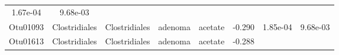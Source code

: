 \documentclass[11pt,]{article}
\begin{document}
\begin{longtable}[]{@{}cccccccc@{}}
\begin{minipage}[t]{0.08\columnwidth}
1.67e-04\strut
\end{minipage} & \begin{minipage}[t]{0.08\columnwidth}\centering\strut
9.68e-03\strut
\end{minipage}\tabularnewline
\begin{minipage}[t]{0.08\columnwidth}\centering\strut
Otu01093\strut
\end{minipage} & \begin{minipage}[t]{0.15\columnwidth}\centering\strut
Clostridiales\strut
\end{minipage} & \begin{minipage}[t]{0.15\columnwidth}\centering\strut
Clostridiales\strut
\end{minipage} & \begin{minipage}[t]{0.08\columnwidth}\centering\strut
adenoma\strut
\end{minipage} & \begin{minipage}[t]{0.09\columnwidth}\centering\strut
acetate\strut
\end{minipage} & \begin{minipage}[t]{0.07\columnwidth}\centering\strut
-0.290\strut
\end{minipage} & \begin{minipage}[t]{0.08\columnwidth}\centering\strut
1.85e-04\strut
\end{minipage} & \begin{minipage}[t]{0.08\columnwidth}\centering\strut
9.68e-03\strut
\end{minipage}\tabularnewline
\begin{minipage}[t]{0.08\columnwidth}\centering\strut
Otu01613\strut
\end{minipage} & \begin{minipage}[t]{0.15\columnwidth}\centering\strut
Clostridiales\strut
\end{minipage} & \begin{minipage}[t]{0.15\columnwidth}\centering\strut
Clostridiales\strut
\end{minipage} & \begin{minipage}[t]{0.08\columnwidth}\centering\strut
adenoma\strut
\end{minipage} & \begin{minipage}[t]{0.09\columnwidth}\centering\strut
acetate\strut
\end{minipage} & \begin{minipage}[t]{0.07\columnwidth}\centering\strut
-0.288\strut
\end{minipage} & \begin{minipage}[t]{0.08\columnwidth}\centering\strut

\end{minipage}
\end{longtable}
\end{document}

